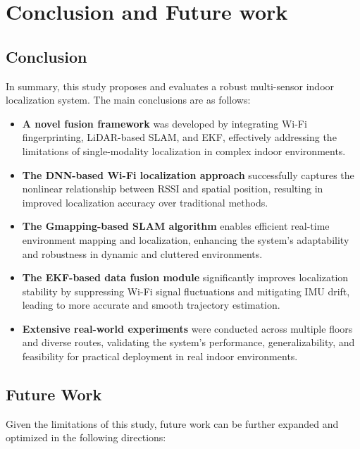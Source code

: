 \documentclass[12pt,a4paper]{article}
\numberwithin{equation}{section}
\begin{document}
\newpage
\section{Conclusion and Future work}
\label{sec:concl-future-work}
\subsection{Conclusion}
In summary, this study proposes and evaluates a robust multi-sensor indoor
localization system. The main conclusions are as follows:

\begin{itemize}
\item \textbf{A novel fusion framework} was developed by integrating Wi-Fi
  fingerprinting, LiDAR-based SLAM, and EKF, effectively addressing the
  limitations of single-modality localization in complex indoor environments.
  
\item \textbf{The DNN-based Wi-Fi localization approach} successfully captures
  the nonlinear relationship between RSSI and spatial position, resulting in
  improved localization accuracy over traditional methods.
  
\item \textbf{The Gmapping-based SLAM algorithm} enables efficient real-time
  environment mapping and localization, enhancing the system's adaptability and
  robustness in dynamic and cluttered environments.
  
\item \textbf{The EKF-based data fusion module} significantly improves
  localization stability by suppressing Wi-Fi signal fluctuations and mitigating
  IMU drift, leading to more accurate and smooth trajectory estimation.
  
\item \textbf{Extensive real-world experiments} were conducted across multiple
  floors and diverse routes, validating the system’s performance,
  generalizability, and feasibility for practical deployment in real indoor
  environments.
\end{itemize}

\subsection{Future Work}
Given the limitations of this study, future work can be further expanded and
optimized in the following directions:
\end{document}
